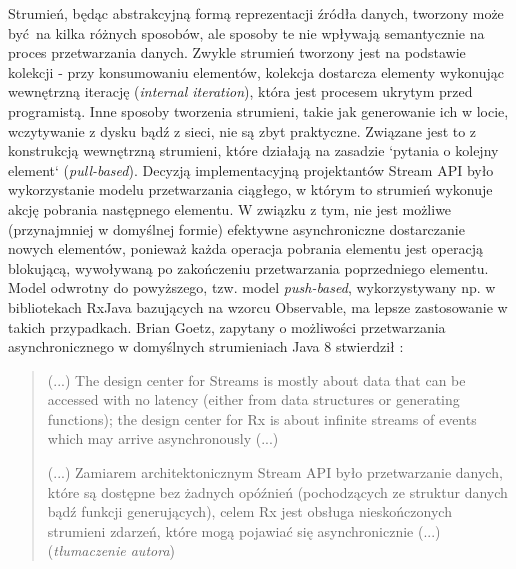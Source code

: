 \documentclass[12pt]{extarticle}
\begin{document}
    Strumień, będąc abstrakcyjną formą reprezentacji źródła danych, tworzony może być na kilka różnych sposobów, ale sposoby te nie wpływają semantycznie na proces przetwarzania danych. Zwykle strumień tworzony jest na podstawie kolekcji - przy konsumowaniu elementów, kolekcja dostarcza elementy wykonując wewnętrzną iterację (\textit{internal iteration}), która jest procesem ukrytym przed programistą. Inne sposoby tworzenia strumieni, takie jak generowanie ich w locie, wczytywanie z dysku bądź z sieci, nie są zbyt praktyczne. Związane jest to z konstrukcją wewnętrzną strumieni, które działają na zasadzie `pytania o kolejny element` (\textit{pull-based}). Decyzją implementacyjną projektantów Stream API było wykorzystanie modelu przetwarzania ciągłego, w którym to strumień wykonuje akcję pobrania następnego elementu. W związku z tym, nie jest możliwe (przynajmniej w domyślnej formie) efektywne asynchroniczne dostarczanie nowych elementów, ponieważ każda operacja pobrania elementu jest operacją blokującą, wywoływaną po zakończeniu przetwarzania poprzedniego elementu. Model odwrotny do powyższego, tzw. model \textit{push-based}, wykorzystywany np. w bibliotekach RxJava bazujących na wzorcu Observable, ma lepsze zastosowanie w takich przypadkach. Brian Goetz, zapytany o możliwości przetwarzania asynchronicznego w domyślnych strumieniach Java 8 stwierdził \cite{goetz}:

\begin{quote}
    (...) The design center for Streams is mostly about data that can be accessed with no latency (either from data structures or generating functions); the design center for Rx is about infinite streams of events which may arrive asynchronously (...)

    (...) Zamiarem architektonicznym Stream API było przetwarzanie danych, które są dostępne bez żadnych opóźnień (pochodzących ze struktur danych bądź funkcji generujących), celem Rx jest obsługa nieskończonych strumieni zdarzeń, które mogą pojawiać się asynchronicznie (...) (\textit{tłumaczenie autora})

\end{quote}
\end{document}
